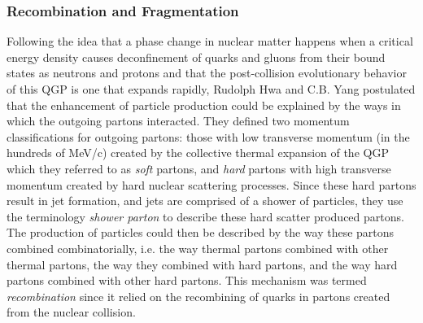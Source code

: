 \subsubsection{Recombination and Fragmentation}
Following the idea that a phase change in nuclear matter happens when a critical energy density causes deconfinement of quarks and gluons from their bound states as neutrons and protons and that the post-collision evolutionary behavior of this QGP is one that expands rapidly, Rudolph Hwa and C.B. Yang postulated that the enhancement of particle production could be explained by the ways in which the outgoing partons interacted\citep{PhysRevC.70.024905}. They defined two momentum classifications for outgoing partons: those with low transverse momentum (in the hundreds of MeV/c) created by the collective thermal expansion of the QGP which they referred to as \textit{soft} partons, and \textit{hard} partons with high transverse momentum created by hard nuclear scattering processes. Since these hard partons result in jet formation, and jets are comprised of a shower of particles, they use the terminology \textit{shower parton} to describe these hard scatter produced partons. The production of particles could then be described by the way these partons combined combinatorially, i.e. the way thermal partons combined with other thermal partons, the way they combined with hard partons, and the way hard partons combined with other hard partons. This mechanism was termed \textit{recombination} since it relied on the recombining of quarks in partons created from the nuclear collision.

